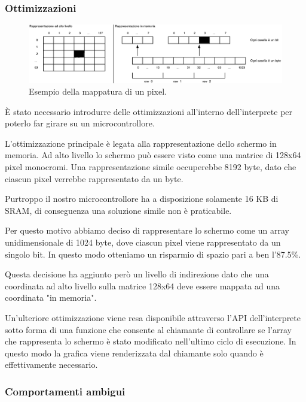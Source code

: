 \documentclass[a4paper]{article}
\begin{document}
\subsubsection{Ottimizzazioni}

\begin{figure}[h!t]
    \begin{center}
        \includegraphics[scale=0.38]{figures/screenopt_small.pdf}
    \end{center}
    \caption{Esempio della mappatura di un pixel.}
    \label{fig:screenopt}
\end{figure}

È stato necessario introdurre delle ottimizzazioni all'interno
dell'interprete per poterlo far girare su un microcontrollore.

L'ottimizzazione principale è legata alla rappresentazione dello
schermo in memoria. Ad alto livello lo schermo può essere visto
come una matrice di 128x64 pixel monocromi. Una rappresentazione
simile occuperebbe 8192 byte, dato che ciascun pixel verrebbe
rappresentato da un byte.

Purtroppo il nostro microcontrollore ha a disposizione solamente 16 KB di SRAM, di conseguenza
una soluzione simile non è praticabile.

Per questo motivo abbiamo deciso di rappresentare lo schermo come un array unidimensionale di
1024 byte, dove ciascun pixel viene rappresentato da un singolo bit. In questo modo otteniamo
un risparmio di spazio pari a ben l'87.5\%.

Questa decisione ha aggiunto però un livello di indirezione dato
che una coordinata ad alto livello sulla matrice 128x64 deve essere
mappata ad una coordinata "in memoria".

Un'ulteriore ottimizzazione viene resa disponibile attraverso l'API
dell'interprete sotto forma di una funzione che consente al chiamante
di controllare se l'array che rappresenta lo schermo è stato
modificato nell'ultimo ciclo di esecuzione. In questo modo la grafica
viene renderizzata dal chiamante solo quando è effettivamente
necessario.

\subsubsection{Comportamenti ambigui}
\end{document}
